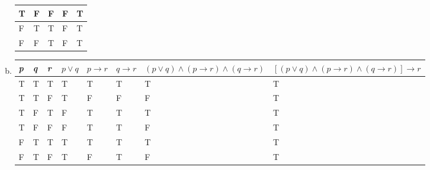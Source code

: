 \begin{itemize}
\begin{enumerate}[a.]
\begin{tabular}{*{5}{|l}|}
                        \hline
                        T          & F          & F         & F                   & T                           \\
                        \hline
                        F          & T          & T         & F                   & T                           \\
                        \hline
                        F          & F          & T         & F                   & T                           \\
                        \hline
                    \end{tabular}
                    \newpage
              \item
                    \begin{tabular}{*{6}{|l} *{2}{|p{3.2cm}}|}
                        \hline
                        \textit{p} & \textit{q} & \textit{r} & $p \lor q$ & $p \to r$ & $q \to r$ & $(p \lor q) \land (p \to r) \land (q \to r) $ & $[(p \lor q) \land (p \to r) \land (q \to r)] \to r$
                        \\
                        \hline
                        T          & T          & T          & T          & T         & T         & T                                             & T                                                    \\
                        \hline
                        T          & T          & F          & T          & F         & F         & F                                             & T                                                    \\
                        \hline
                        T          & F          & T          & F          & T         & T         & T                                             & T                                                    \\
                        \hline
                        T          & F          & F          & F          & T         & T         & F                                             & T                                                    \\
                        \hline
                        F          & T          & T          & T          & T         & T         & T                                             & T                                                    \\
                        \hline
                        F          & T          & F          & T          & F         & T         & F                                             & T                                                    \\

\end{tabular}
\end{enumerate}
\end{itemize}
